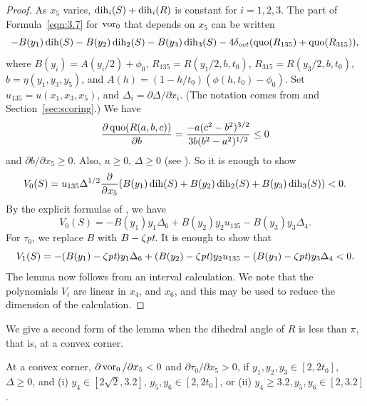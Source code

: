 \begin{proof}
As $x_5$ varies, $\operatorname{dih}_i(S)+\operatorname{dih}_i(R)$ is constant for $i=1,2,3$. The
part of Formula~\ref{eqn:3.7} for $\operatorname{vor}_0$ that depends on $x_5$ can be
written
    $$-B(y_1)\operatorname{dih}(S)-B(y_2)\operatorname{dih}_2(S)-B(y_3)\operatorname{dih}_3(S)-4\delta_{oct}
        (\operatorname{quo}(R_{135})+\operatorname{quo}(R_{315})),
    $$
where $B(y_i)=A(y_i/2)+\phi_0$, $R_{135}=R(y_1/2,b,t_0)$,
$R_{315}=R(y_3/2,b,t_0)$, $b=\eta(y_1,y_3,y_5)$, and $A(h) =
(1-h/t_0)(\phi(h,t_0)-\phi_0)$. Set $u_{135}=u(x_1,x_3,x_5)$, and
$\Delta_i = \partial \Delta/\partial x_i$. (The notation comes from
\cite[Sec.~8]{part1} and Section~\ref{sec:scoring}.) We have
    $$\frac{\partial \operatorname{quo}(R(a,b,c))}{\partial b} =
        \frac{-a (c^2-b^2)^{3/2}}{3 b (b^2-a^2)^{1/2}}\le 0
    $$
and $\partial b/\partial x_5\ge0$.  Also, $u\ge0$, $\Delta\ge0$ (see
\cite[Sec.~8]{part1}).  So it is enough to show
    $$V_0(S) = u_{135}\Delta^{1/2}
        \frac{\partial}{\partial x_5} (B(y_1)\operatorname{dih}(S)+B(y_2)\operatorname{dih}_2(S)
        + B(y_3)\operatorname{dih}_3(S))< 0.
    $$
By the explicit formulas of \cite[Sec.~8]{part1}, we have
    $$
    V_0(S) = -B(y_1)y_1\Delta_6 + B(y_2)y_2 u_{135} - B(y_3)y_3 \Delta_4.
    $$
For $\tau_0$, we replace $B$ with $B-\zeta\hbox{\it pt}$. It is enough to
show that
    $$
    V_1(S) = -(B(y_1)-\zeta\hbox{\it pt})y_1\Delta_6 + (B(y_2)-\zeta\hbox{\it pt})y_2 u_{135} -
        (B(y_3)-\zeta\hbox{\it pt})y_3 \Delta_4<0.
    $$
The lemma now follows from an interval calculation.
We note that the polynomials $V_i$
are linear in $x_4$, and $x_6$, and this may be used to reduce the
dimension of the calculation.
\end{proof}

We give a second form of the lemma when the dihedral angle of $R$ is
less than $\pi$, that is, at a convex corner.


\begin{lemma}
At a convex corner, $\partial \operatorname{vor}_0/\partial x_5 <0$ and
    $\partial \tau_0/\partial x_5>0$, if $y_1,y_2,y_3\in[2,2t_0]$,
$\Delta\ge0$, and (i) $y_4\in[2\sqrt{2},3.2]$, $y_5,y_6\in[2,2t_0]$, or
(ii) $y_4\ge 3.2, y_5,y_6\in[2,3.2]$.
\end{lemma}

